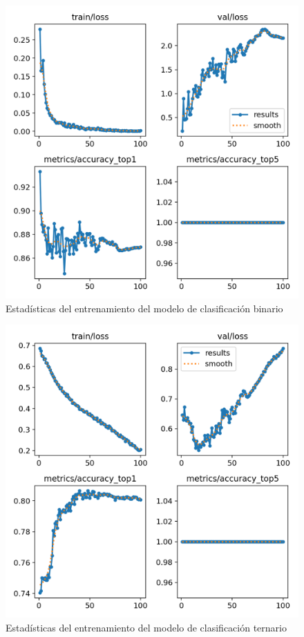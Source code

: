 \documentclass[12pt]{report} %
\begin{document}
\begin{minipage}{0.45\textwidth}
    \begin{figure}[H]
    \includegraphics[width=\textwidth]{results2.png}
    \caption  {\small{Estadísticas del entrenamiento del modelo de clasificación binario}}
    \end{figure}
\end{minipage}
\hspace{0.5cm}
\begin{minipage}{0.45\textwidth}
    \begin{figure}[H]
    \includegraphics[width=\textwidth]{results3.png}
    \caption  {\small{Estadísticas del entrenamiento del modelo de clasificación ternario}}
    \end{figure}
\end{minipage}
\end{document}
